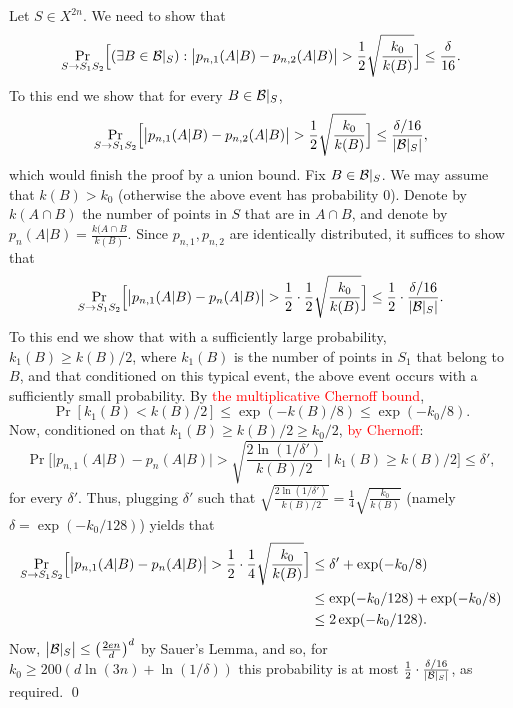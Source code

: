 \documentclass{article}
\newcommand{\B}{{\cal B}}
\newcommand{\new}[1]{\textcolor{red}{#1}}
\newcommand{\comment}[3]{\marginpar{\textcolor{#2}{#1: #3}}}
\newcommand{\shay}[1]{\comment{Shay}{red}{#1}}
\begin{document}
Let $S\in X^{2n}$. 
We need to show that
\[\Pr_{S\to S_1S_2}\Bigl[(\exists B\in \B|_S) : \bigl\lvert p_{n,1}(A \vert B) - p_{n,2}(A \vert B)  \bigr\rvert > \frac{1}{2}\sqrt{\frac{k_0}{k(B)}} \Bigr] \leq \frac{\delta}{16}.\]
To this end we show that
for every $B\in \B|_S$, 
\[\Pr_{S\to S_1S_2}\Bigl[\bigl\lvert p_{n,1}(A \vert B) - p_{n,2}(A \vert B)  \bigr\rvert > \frac{1}{2}\sqrt{\frac{k_0}{k(B)}} \Bigr] \leq \frac{\delta/16}{\lvert \B|_S\rvert},\]
which would finish the proof by a union bound.
Fix $B\in \B|_S$. 
We may assume that $k(B)> k_0$ (otherwise the above event has probability $0$). 
Denote by $k(A\cap B)$ the number of points in $S$
that are in $A\cap B$, and denote by $p_n(A\vert B) = \frac{k(A\cap B}{k(B)}$.
Since $p_{n,1},p_{n,2}$ are identically distributed, it suffices to show that
\[\Pr_{S\to S_1S_2}\Bigl[\bigl\lvert p_{n,1}(A \vert B) - p_{n}(A \vert B)  \bigr\rvert > \frac{1}{2}\cdot\frac{1}{2}\sqrt{\frac{k_0}{k(B)}} \Bigr] \leq \frac{1}{2}\cdot\frac{\delta/16}{\lvert \B|_S\rvert}.\]
To this end we show that with a sufficiently large probability, 
$k_1(B)\geq k(B)/2$, where $k_1(B)$ is the number of points in $S_1$ that belong to $B$,
and that conditioned on this typical event, the above event occurs with a sufficiently small probability.
By \new{the multiplicative Chernoff bound},
\shay{Here we should refer to the statement that sampling without repetitions is more concentrated.}
\[ \Pr[k_1(B) < k(B)/2] \leq \exp(-k(B)/8) \leq \exp(-k_0/8).\]
Now, conditioned on that $k_1(B) \geq k(B)/2\geq k_0/2$, \new{by Chernoff}:
\[\Pr\Biggl[ \bigl\lvert p_{n,1}(A \vert B) - p_n(A \vert B) \bigr\rvert >\sqrt{\frac{2\ln(1/\delta')}{k(B)/2}}~ \Biggr\vert~ k_1(B) \geq k(B)/2\Biggr] \leq \delta',
\]
for every $\delta'$. 
Thus, plugging $\delta'$ such that $\sqrt{\frac{2\ln(1/\delta')}{k(B)/2}} = \frac{1}{4}\sqrt{\frac{k_0}{k(B)}}$
(namely $\delta = \exp(-k_0/128)$) yields that
\begin{align*}
\Pr_{S\to S_1S_2}\Bigl[\bigl\lvert p_{n,1}(A \vert B) - p_{n}(A \vert B)  \bigr\rvert > \frac{1}{2}\cdot\frac{1}{4}\sqrt{\frac{k_0}{k(B)}} \Bigr] 
&\leq  \delta' + \exp(-k_0/8)\\
&\leq  \exp(-k_0/128) + \exp(-k_0/8)\\
&\leq 2\exp(-k_0/128).
\end{align*}
Now, $\bigl\lvert \B|_S\bigr\rvert \leq \bigl(\frac{2en}{d}\bigr)^d$ by Sauer's Lemma,  and so, for $k_0\geq 200(d\ln(3n) + \ln(1/\delta))$ this probability is at most $\frac{1}{2}\cdot\frac{\delta/16}{\lvert \B|_S\rvert}$, as required.
\qed
\end{document}
